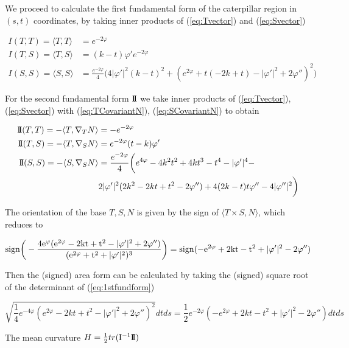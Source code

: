 \documentclass[12pt]{amsart}
\newcommand{\I}{\rm{I}}
\newcommand{\II}{{\rm I}\!{\rm I}}
\begin{document}
We proceed to calculate the first fundamental form of the caterpillar region in $(s,t)$ coordinates, by taking inner products of (\ref{eq:Tvector}) and (\ref{eq:Svector})

\begin{equation}\label{eq:1stfundform}
\begin{split}
    I(T,T) = \langle T,T\rangle &=e^{-2\varphi}\\
    I(T,S) = \langle T,S\rangle &=(k-t)\varphi'e^{-2\varphi}\\
    I(S,S) = \langle S,S\rangle &=\frac{e^{-2\varphi}}{4}\bigg(4|\varphi'|^2(k-t)^2 + (e^{2\varphi} + t(-2k+t) - |\varphi'|^2 + 2\varphi'')^2 \bigg)
\end{split}
\end{equation}

For the second fundamental form $\II$ we take inner products of (\ref{eq:Tvector}), (\ref{eq:Svector}) with (\ref{eq:TCovariantN}), (\ref{eq:SCovariantN}) to obtain

\begin{equation}\label{eq:2ndfunform}
\begin{split}
    \II(T,T) = -\langle T,\nabla_T N\rangle &=-e^{-2\varphi}\\
    \II(T,S) = -\langle T,\nabla_S N\rangle &=e^{-2\varphi}(t-k)\varphi'\\
    \II(S,S) = -\langle S,\nabla_S N\rangle &= \frac{e^{-2 \varphi}}{4} \bigg(e^{4\varphi}-4 k^2 t^2+4 k t^3-t^4-|\varphi'|^4-\\&2 |\varphi'|^2 (2 k^2-2 k t+t^2-2\varphi'')+4 (2 k-t) t \varphi''-4 |\varphi''|^2\bigg)
\end{split}
\end{equation}

The orientation of the base $T,S,N$ is given by the sign of $\langle T\times S,N \rangle$, which reduces to

\[\rm{sign}\bigg(-\frac{4 e^\varphi (e^{2 \varphi}-2 k t+t^2-|\varphi'|^2+2\varphi'')}{(e^{2\varphi}+t^2+|\varphi'|^2)^3}\bigg) = \rm{sign} (-e^{2\varphi}+2 k t-t^2+|\varphi'|^2- 2\varphi'')
\]

Then the (signed) area form can be calculated by taking the (signed) square root of the determinant of (\ref{eq:1stfundform})

\[\sqrt{\frac14 e^{-4\varphi} (e^{2\varphi}-2 k t+t^2-|\varphi'|^2+ 2\varphi'')^2}dtds = \frac12 e^{-2\varphi} (-e^{2\varphi}+2 k t-t^2+|\varphi'|^2- 2\varphi'')dtds
\]

The mean curvature $H=\frac12tr(\I^{-1}\II)$ 
\end{document}
